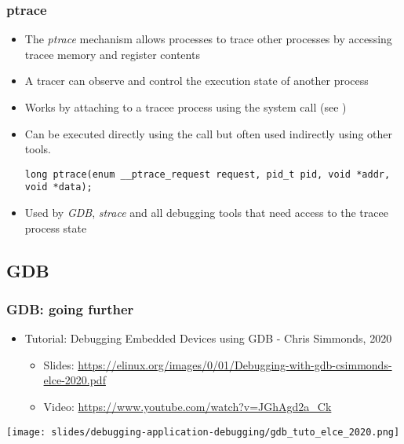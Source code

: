 \begin{frame}[fragile]
  \frametitle{ptrace}
  \begin{itemize}
    \item The {\em ptrace} mechanism allows processes to trace other processes by
          accessing tracee memory and register contents
    \item A tracer can observe and control the execution state of another
          process
    \item Works by attaching to a tracee process using the 
          system call (see )
    \item Can be executed directly using the  call but often used
          indirectly using other tools.

  \begin{block}{}
    \begin{verbatim}
long ptrace(enum __ptrace_request request, pid_t pid, void *addr, void *data);
    \end{verbatim}
  \end{block}

    \item Used by {\em GDB}, {\em strace} and all debugging tools that need access to the
          tracee process state
  \end{itemize}
\end{frame}

\subsection{GDB}



\begin{frame}
  \frametitle{GDB: going further}
  \begin{itemize}
    \item Tutorial: Debugging Embedded Devices using GDB - Chris Simmonds, 2020
    \begin{itemize}
      \item Slides: \url{https://elinux.org/images/0/01/Debugging-with-gdb-csimmonds-elce-2020.pdf}
      \item Video: \url{https://www.youtube.com/watch?v=JGhAgd2a_Ck}
    \end{itemize}
  \end{itemize}
  \begin{center}
    \texttt{[image: slides/debugging-application-debugging/gdb\_tuto\_elce\_2020.png]}
  \end{center}
\end{frame}

